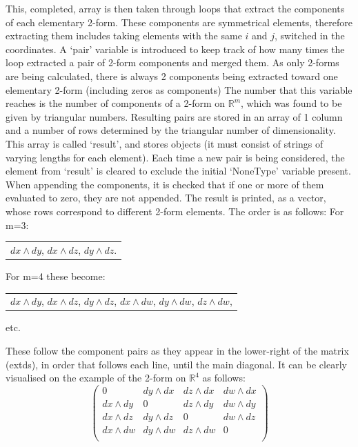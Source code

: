 \documentclass[12pt]{report}
\begin{document}
\noindent This, completed, array is then taken through loops that extract the components of each elementary 2-form. These components are symmetrical elements, therefore extracting them includes taking elements with the same $i$ and $j$, switched in the coordinates. A `pair' variable is introduced to keep track of how many times the loop extracted a pair of 2-form components and merged them. As only 2-forms are being calculated, there is always 2 components being extracted toward one elementary 2-form (including zeros as components) The number that this variable reaches is the number of components of a 2-form on $\mathbb{R}^{m}$, which was found to be given by triangular numbers. Resulting pairs are stored in an array of 1 column and a number of rows determined  by the triangular number of dimensionality. This array is called `result', and stores objects (it must consist of strings of varying lengths for each element). Each time a new pair is being considered, the element from `result' is cleared to exclude the initial `NoneType' variable present. When appending the components, it is checked that if one or more of them evaluated to zero, they are not appended.
The result is printed, as a vector, whose rows correspond to different 2-form elements. The order is as follows:
For m=3:
\begin{center}
	\begin{tabular}{c}
		$ dx \wedge dy$, 
		$ dx \wedge dz$, 
		$ dy \wedge dz$.
	\end{tabular}
\end{center}

For m=4 these become:

\begin{center}
	\begin{tabular}{c}
		$ dx \wedge dy$,
		$ dx \wedge dz$,
		$ dy \wedge dz$,
		$ dx \wedge dw$,
		$ dy \wedge dw$,
		$ dz \wedge dw$,
		
	\end{tabular}
\end{center}
etc.

These follow the component pairs as they appear in the lower-right of the matrix (ext\textunderscore ds), in order that follows each line, until the main diagonal.
It can be clearly visualised on the example of the 2-form on $\mathbb{R}^{4}$ as follows:
\begin{equation}
		\begin{pmatrix}
			0 & dy \wedge dx & dz \wedge dx & dw \wedge dx \\
			dx \wedge dy & 0 & dz \wedge dy & dw \wedge dy \\
			dx \wedge dz & dy \wedge dz & 0 & dw \wedge dz \\
			dx \wedge dw & dy \wedge dw & dz \wedge dw & 0 \\
		\end{pmatrix}
\end{equation}
\end{document}
